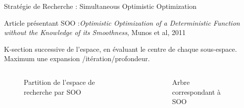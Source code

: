 \begin{frame}{Stratégie de Recherche : Simultaneous Optimistic Optimization}

    \vspace*{-8pt}
    \begin{block}{}
        Article présentant SOO :{\small \textit{Optimistic Optimization of a Deterministic Function without the Knowledge of its Smoothness}, Munos et al, 2011}

        K-section successive de l'espace, en évaluant le centre de chaque sous-espace. Maximum une expansion /itération/profondeur.
    \end{block}

    \vspace*{-14pt}
    \begin{columns}
        
        \begin{column}[t]{0.5\textwidth} 
            \begin{figure}
                \centering
                
                \vspace*{-1pt}
                \caption{Partition de l'espace de recherche par SOO}
            \end{figure} 
     
            \end{column}
                 
            \begin{column}[t]{0.5\textwidth}
                \begin{figure}
                    \centering
                    
                    \vspace*{-3pt}
                    \caption{Arbre correspondant à SOO}
                \end{figure} 
            \end{column}
                 
    \end{columns}

\end{frame}

